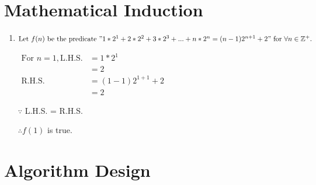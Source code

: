 \documentclass{article}
\begin{document}
\section{Mathematical Induction}

\begin{enumerate}[label=(\alph*)]

\item $\text{Let } f(n) \text{ be the predicate } "1*2^1 + 2*2^2 + 3*2^3 + ... + n*2^n = (n-1)2^{n+1} + 2" \text{ for } \forall n \in \mathbb{Z}^+.$

$\begin{aligned}
\text{For } n=1, \text{L.H.S.} &= 1*2^1 \\
&= 2 \\
\text{R.H.S.} &= (1-1)2^{1+1} + 2 \\
&= 2
\end{aligned}$

$\because$ L.H.S. = R.H.S.

$\therefore f(1)$ is true.

\end{enumerate}

\section{Algorithm Design}
\end{document}
